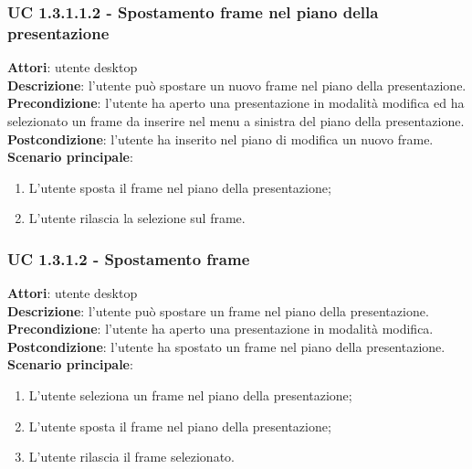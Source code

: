 \subsubsection{UC 1.3.1.1.2 - Spostamento frame nel piano della presentazione}{
	\label{uc1.3.1.1.2}
	\textbf{Attori}: utente desktop \\
	\textbf{Descrizione}: l'utente può spostare un nuovo frame nel piano della presentazione. \\
	\textbf{Precondizione}: l'utente ha aperto una presentazione in modalità modifica ed ha selezionato un frame da inserire nel menu a sinistra del piano della presentazione.	\\
	\textbf{Postcondizione}: l'utente ha inserito nel piano di modifica un nuovo frame.	\\
	\textbf{Scenario principale}:
	\begin{enumerate}
		\item L'utente sposta il frame nel piano della presentazione;
		\item L'utente rilascia la selezione sul frame.
	\end{enumerate}
	}
\subsubsection{UC 1.3.1.2 - Spostamento frame}{
	\label{uc1.3.1.2}
	\textbf{Attori}: utente desktop \\
	\textbf{Descrizione}: l'utente può spostare un frame nel piano della presentazione. \\
	\textbf{Precondizione}: l'utente ha aperto una presentazione in modalità modifica.	\\
	\textbf{Postcondizione}: l'utente ha spostato un frame nel piano della presentazione.	\\
	\textbf{Scenario principale}:
	\begin{enumerate}
		\item L'utente seleziona un frame nel piano della presentazione;
		\item L'utente sposta il frame nel piano della presentazione;
		\item L'utente rilascia il frame selezionato.
	\end{enumerate}
	}
